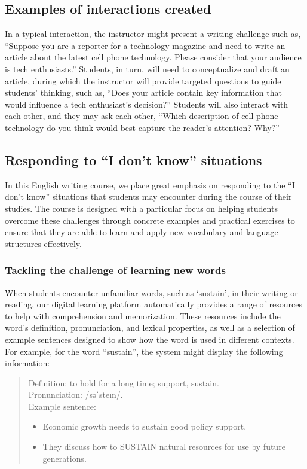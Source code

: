 \documentclass[11pt]{article}
\begin{document}
\subsection{Examples of interactions created}

In a typical interaction, the instructor might present a writing challenge such as, ``Suppose you are a reporter for a technology magazine and need to write an article about the latest cell phone technology. Please consider that your audience is tech enthusiasts.'' Students, in turn, will need to conceptualize and draft an article, during which the instructor will provide targeted questions to guide students' thinking, such as, ``Does your article contain key information that would influence a tech enthusiast's decision?'' Students will also interact with each other, and they may ask each other, ``Which description of cell phone technology do you think would best capture the reader's attention? Why?''

\subsection{Responding to ``I don't know'' situations}

In this English writing course, we place great emphasis on responding to the ``I don't know'' situations that students may encounter during the course of their studies. The course is designed with a particular focus on helping students overcome these challenges through concrete examples and practical exercises to ensure that they are able to learn and apply new vocabulary and language structures effectively.

\subsubsection*{Tackling the challenge of learning new words}

When students encounter unfamiliar words, such as `sustain', in their writing or reading, our digital learning platform automatically provides a range of resources to help with comprehension and memorization. These resources include the word's definition, pronunciation, and lexical properties, as well as a selection of example sentences designed to show how the word is used in different contexts. For example, for the word ``sustain'', the system might display the following information:

\begin{quote}
\begin{minipage}{\linewidth}
Definition: to hold for a long time; support, sustain. \\
Pronunciation: {\ipafont /səˈsteɪn/}. \\
Example sentence:
\begin{itemize}[label={},leftmargin=1.5em,topsep=0pt,itemsep=0pt]
  \item Economic growth needs to sustain good policy support.
  \item They discuss how to SUSTAIN natural resources for use by future generations.
\end{itemize}
\end{minipage}
\end{quote}
\end{document}
